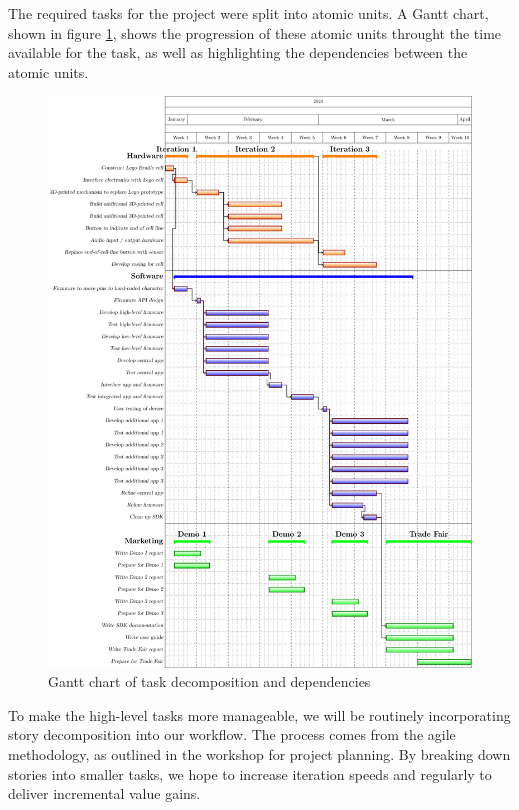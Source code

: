 \documentclass{article}
\begin{document}
The required tasks for the project were split into atomic units. A Gantt chart, shown in figure \ref{fig:gantt}, shows the progression of these atomic units throught the time available for the task, as well as highlighting the dependencies between the atomic units.

\begin{figure}[h]
\vskip 5mm
\begin{center}
\centerline{\includegraphics[height=\textheight]{figs/gantttest}}
\caption{Gantt chart of task decomposition and dependencies}
\label{fig:gantt}
\end{center}
\vskip -5mm
\end{figure} 

To make the high-level tasks more manageable, we will be routinely incorporating story decomposition into our workflow. The process comes from the agile methodology, as outlined in the workshop for project planning. By breaking down stories into smaller tasks, we hope to increase iteration speeds and regularly to deliver incremental value gains.
\end{document}
